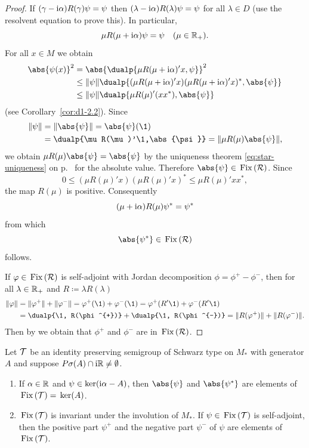 \begin{proof}
If\/ $(\gamma - \mathrm{i}\alpha)R(\gamma)\psi = \psi$ then $(\lambda - \mathrm{i}\alpha)R(\lambda)\psi = \psi$ for all $\lambda \in D$ (use the resolvent equation to prove this).
In particular, 
\[
\mu R(\mu + \mathrm{i}\alpha)\psi = \psi \quad (\mu \in \mathbb{R}_{+}).
\]
For all $x \in M$ we obtain
\begin{align*}
\abs{\psi(x)}^2 &= \abs{\dualp{\mu R(\mu+\im\alpha)'x,\psi}}^2 \\
&\leq \|\psi\| \dualp{(\mu R(\mu+\im\alpha)'x)(\mu R(\mu+\im\alpha)'x)^{*},\abs{\psi}}  \\
&\leq \|\psi\| \dualp{\mu R(\mu)'(xx^{*}),\abs{\psi}}
\end{align*}
(see Corollary~\ref{cor:d1-2.2}).
Since
\begin{align*}
\|\psi\| &= \| \abs{\psi} \| = \abs{\psi}(\1) \\
&= \dualp{\mu R(\mu)'\1,\abs{\psi}} = \| \mu R(\mu)\abs{\psi} \|,
\end{align*}
we obtain $\mu R(\mu)\abs{\psi} = \abs{\psi}$ by the uniqueness theorem \eqref{eq:star-uniqueness} on p.~\pageref{eq:star-uniqueness} for the absolute value.
Therefore $\abs{\psi} \in \Fix{\RR} $.
Since
\[
0 \leq (\mu R(\mu)'x)(\mu R(\mu)'x)^{*} \leq \mu R(\mu)'xx^{*},
\]
the map $R(\mu)$ is positive.
Consequently 
\[
(\mu+\mathrm{i}\alpha)R(\mu)\psi^{*} = \psi^{*}
\]
from which 
\[
\abs{\psi^{*}} \in \Fix{\RR} 
\]
follows.

If\/ $\phi \in \Fix{\RR} $ is self-adjoint with Jordan decomposition $\phi = \phi^{+} - \phi^{-}$, then for all $\lambda \in \mathbb{R}_{+}$ and $R \coloneq \lambda R(\lambda)$
\begin{align*}
\| \phi \| &= \| \phi^{+} \| + \| \phi^{-} \|  =
    \phi^{+}(\1) + \phi^{-}(\1) = \phi^{+}(R'\1) + \phi^{-}(R'\1) \\
    &= \dualp{\1, R(\phi^{+})}  + \dualp{\1, R(\phi^{-})}   =
    \| R(\phi^{+}) \| + \| R(\phi^{-}) \| .
\end{align*}
Then by \textcite[Theorem III.4.2.]{takesaki:1979} we obtain that $\phi^{+}$ and $\phi^{-}$ are in $ \mathop{}\mathrm{Fix}\left(\mathcal{R}\right) $.
\end{proof}
\begin{corollary}\label{cor:d3-1.5}
Let $\mathcal{T}$ be an identity preserving semigroup of Schwarz type on $M_{*}$ with generator $A$ and suppose $P\sigma(A) \cap \mathrm{i}\mathbb{R} \neq \emptyset$.
\begin{enumerate}[\upshape (i)]
\item
If\/ $\alpha \in \mathbb{R}$ and $\psi \in \operatorname{ker}(\mathrm{i}\alpha - A)$, then $\abs{\psi}$ and $\abs{\psi^{*}}$ are elements of\/ $\mathop{}\mathrm{Fix}\left(\mathcal{T}\right) = \mathop{}\mathrm{ker}(A)$.

\item 
$\mathop{}\mathrm{Fix}\left(\mathcal{T}\right)$ is invariant under the involution of\/ $M_{*}$.
If\/ $\psi \in \mathop{}\mathrm{Fix}\left(\mathcal{T}\right)$ is self-adjoint, then the positive part $\psi^{+}$ and the negative part $\psi^{-}$ of\/ $\psi$ are elements of\/ $\mathop{}\mathrm{Fix}\left(\mathcal{T}\right)$.
\end{enumerate}
\end{corollary}
